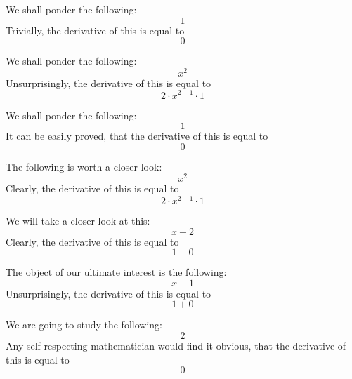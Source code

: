 \documentclass{article}
\begin{document}
We shall ponder the following:
\begin{equation}
1 
\end{equation}
Trivially, the derivative of this is equal to
\begin{equation}
0 
\end{equation}

We shall ponder the following:
\begin{equation}
x ^{2 } 
\end{equation}
Unsurprisingly, the derivative of this is equal to
\begin{equation}
2 \cdot x ^{2 - 1 } \cdot 1 
\end{equation}

We shall ponder the following:
\begin{equation}
1 
\end{equation}
It can be easily proved, that the derivative of this is equal to
\begin{equation}
0 
\end{equation}

The following is worth a closer look:
\begin{equation}
x ^{2 } 
\end{equation}
Clearly, the derivative of this is equal to
\begin{equation}
2 \cdot x ^{2 - 1 } \cdot 1 
\end{equation}

We will take a closer look at this:
\begin{equation}
x - 2 
\end{equation}
Clearly, the derivative of this is equal to
\begin{equation}
1 - 0 
\end{equation}

The object of our ultimate interest is the following:
\begin{equation}
x + 1 
\end{equation}
Unsurprisingly, the derivative of this is equal to
\begin{equation}
1 + 0 
\end{equation}

We are going to study the following:
\begin{equation}
2 
\end{equation}
Any self-respecting mathematician would find it obvious, that the derivative of this is equal to
\begin{equation}
0 
\end{equation}
\end{document}
